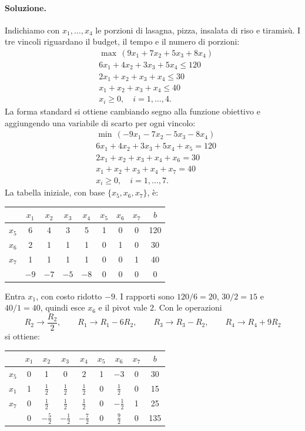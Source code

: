 \paragraph{Soluzione.}
Indichiamo con $x_1, \dots, x_4$ le porzioni di lasagna, pizza, insalata di riso e tiramisù. I tre vincoli riguardano il budget, il tempo e il numero di porzioni:
\[
\begin{aligned}
&\max\, (9x_1 + 7x_2 + 5x_3 + 8x_4) \\
&6x_1 + 4x_2 + 3x_3 + 5x_4 \le 120 \\
&2x_1 + x_2 + x_3 + x_4 \le 30 \\
&x_1 + x_2 + x_3 + x_4 \le 40 \\
&x_i \ge 0, \quad i = 1, \dots, 4.
\end{aligned}
\]
La forma standard si ottiene cambiando segno alla funzione obiettivo e aggiungendo una variabile di scarto per ogni vincolo:
\[
\begin{aligned}
&\min\, (-9x_1 - 7x_2 - 5x_3 - 8x_4) \\
&6x_1 + 4x_2 + 3x_3 + 5x_4 + x_5 = 120 \\
&2x_1 + x_2 + x_3 + x_4 + x_6 = 30 \\
&x_1 + x_2 + x_3 + x_4 + x_7 = 40 \\
&x_i \ge 0, \quad i = 1, \dots, 7.
\end{aligned}
\]
La tabella iniziale, con base $\{x_5, x_6, x_7\}$, è:
\begin{center}
\begin{tabular}{c|ccccccc|c}
 & $x_1$ & $x_2$ & $x_3$ & $x_4$ & $x_5$ & $x_6$ & $x_7$ & $b$ \\
\hline
$x_5$ & 6 & 4 & 3 & 5 & 1 & 0 & 0 & 120 \\
$x_6$ & $\boxed{2}$ & 1 & 1 & 1 & 0 & 1 & 0 & 30 \\
$x_7$ & 1 & 1 & 1 & 1 & 0 & 0 & 1 & 40 \\
\hline
 & $-9$ & $-7$ & $-5$ & $-8$ & 0 & 0 & 0 & 0 \\
\end{tabular}
\end{center}
Entra $x_1$, con costo ridotto $-9$. I rapporti sono $120/6 = 20$, $30/2 = 15$ e $40/1 = 40$, quindi esce $x_6$ e il pivot vale $2$. Con le operazioni
\[
R_2 \to \frac{R_2}{2}, \qquad R_1 \to R_1 - 6R_2, \qquad R_3 \to R_3 - R_2, \qquad R_4 \to R_4 + 9R_2
\]
si ottiene:
\begin{center}
\begin{tabular}{c|ccccccc|c}
 & $x_1$ & $x_2$ & $x_3$ & $x_4$ & $x_5$ & $x_6$ & $x_7$ & $b$ \\
\hline
$x_5$ & 0 & 1 & 0 & $\boxed{2}$ & 1 & $-3$ & 0 & 30 \\
$x_1$ & 1 & $\frac12$ & $\frac12$ & $\frac12$ & 0 & $\frac12$ & 0 & 15 \\
$x_7$ & 0 & $\frac12$ & $\frac12$ & $\frac12$ & 0 & $-\frac12$ & 1 & 25 \\
\hline
 & 0 & $-\frac52$ & $-\frac12$ & $-\frac72$ & 0 & $\frac92$ & 0 & 135 \\
\end{tabular}
\end{center}
